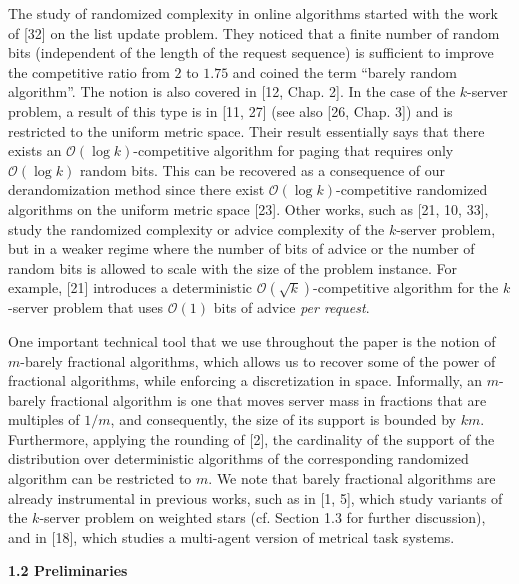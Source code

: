 The study of randomized complexity in online algorithms started with the work of [32] on the list update problem. They noticed that a finite number of random bits (independent of the length of the request sequence) is sufficient to improve the competitive ratio from $2$ to $1.75$ and coined the term “barely random algorithm”. The notion is also covered in [12, Chap. 2]. In the case of the $k$-server problem, a result of this type is in [11, 27] (see also [26, Chap. 3]) and is restricted to the uniform metric space. Their result essentially says that there exists an $\mathcal{O}(\log k)$-competitive algorithm for paging that requires only $\mathcal{O}(\log k)$ random bits. This can be recovered as a consequence of our derandomization method since there exist $\mathcal{O}(\log k)$-competitive randomized algorithms on the uniform metric space [23]. Other works, such as [21, 10, 33], study the randomized complexity or advice complexity of the $k$-server problem, but in a weaker regime where the number of bits of advice or the number of random bits is allowed to scale with the size of the problem instance. For example, [21] introduces a deterministic $\mathcal{O}(\sqrt{k})$-competitive algorithm for the $k$-server problem that uses $\mathcal{O}(1)$ bits of advice \emph{per request}.\par




One important technical tool that we use throughout the paper is the notion of $m$-barely fractional algorithms, which allows us to recover some of the power of fractional algorithms, while enforcing a discretization in space. Informally, an $m$-barely fractional algorithm is one that moves server mass in fractions that are multiples of $1/m$, and consequently, the size of its support is bounded by $km$. Furthermore, applying the rounding of [2], the cardinality of the support of the distribution over deterministic algorithms of the corresponding randomized algorithm can be restricted to $m$. We note that barely fractional algorithms are already instrumental in previous works, such as in [1, 5], which study variants of the $k$-server problem on weighted stars (cf. Section 1.3 for further discussion), and in [18], which studies a multi-agent version of metrical task systems.\par





\par\medskip\noindent\textbf{
1.2 Preliminaries}\par




